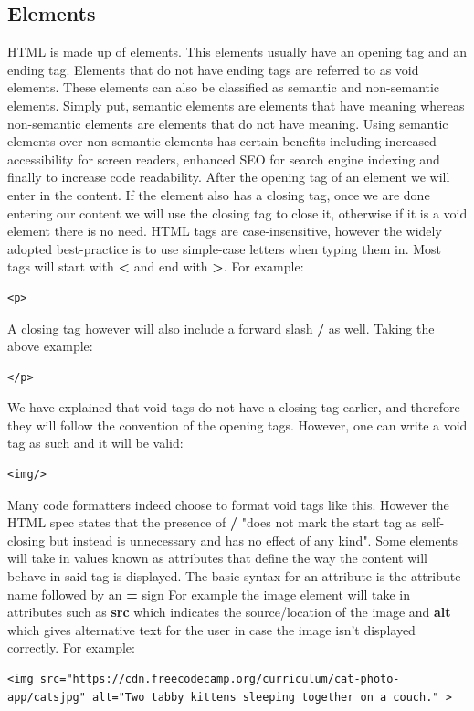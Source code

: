 \documentclass[11pt]{article}
\begin{document}
\subsection{Elements}
\label{sec:orgc3640b0}
HTML is made up of elements. This elements usually have an opening tag and an ending tag. Elements
that do not have ending tags are referred to as void elements. These elements can also be classified
as semantic and non-semantic elements. Simply put, semantic elements are elements that have meaning
whereas non-semantic elements are elements that do not have meaning.
Using semantic elements over non-semantic elements has certain benefits including increased
accessibility for screen readers, enhanced SEO for search engine indexing and finally to increase
code readability.
After the opening tag of an element we will enter in the content. If the element also has a closing
tag, once we are done entering our content we will use the closing tag to close it, otherwise if it
is a void element there is no need.
HTML tags are case-insensitive, however the widely adopted best-practice is to use simple-case
letters when typing them in. Most tags will start with \textbf{<} and end with \textbf{>}. For example:
\begin{verbatim}
<p>
\end{verbatim}
A closing tag however will also include a forward slash \textbf{/} as well. Taking the above example:
\begin{verbatim}
</p>
\end{verbatim}
We have explained that void tags do not have a closing tag earlier, and therefore they will follow
the convention of the opening tags. However, one can write a void tag as such and it will be valid:
\begin{verbatim}
<img/>
\end{verbatim}
Many code formatters indeed choose to format void tags like this. However the HTML spec states that
the presence of \textbf{/} "does not mark the start tag as self-closing but instead is unnecessary and has no
effect of any kind".
Some elements will take in values known as attributes that define the way the content will behave in
said tag is displayed. The basic syntax for an attribute is the attribute name followed by an \textbf{=} sign
For example the image element will take in attributes such as \textbf{src} which
indicates the source/location of the image and \textbf{alt} which gives alternative text for the user in case
the image isn't displayed correctly. For example:
\begin{verbatim}
<img src="https://cdn.freecodecamp.org/curriculum/cat-photo-app/catsjpg" alt="Two tabby kittens sleeping together on a couch." >
\end{verbatim}
\end{document}
